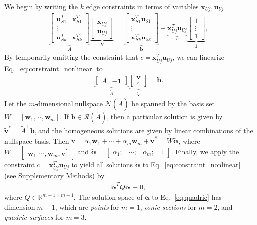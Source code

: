 \documentclass[%
preprint,
 amsmath,amssymb,
 aps,
]{revtex4-1}
\newcommand{\mc}{\mathcal}
\newcommand{\real}{\mathbb{R}}
\begin{document}
We begin by writing the $k$ edge constraints in terms of variables $\bm{x}_{Uj}, \bm{u}_{Uj}$
\begin{align}
\label{eq:constraint_nonlinear}
\underbrace{
\begin{bmatrix}
\bm{u}_{S1}^T & \bm{x}_{S1}^T\\
\vdots & \vdots\\
\bm{u}_{Sk}^T & \bm{x}_{Sk}^T
\end{bmatrix}
}_{A}
\underbrace{
\begin{bmatrix}
\bm{x}_{Uj} \\ 
\bm{u}_{Uj}
\end{bmatrix}
}_{\bm{v}}
=
\underbrace{
\begin{bmatrix} 
\bm{x}_{S1}^T\bm{u}_{S1}\\ 
\vdots\\
\bm{x}_{Sk}^T\bm{u}_{Sk}
\end{bmatrix}
}_{\bm{b}}
+
\underbrace{
\bm{x}_{Uj}^T\bm{u}_{Uj}
}_{c}
\underbrace{
\begin{bmatrix}
1\\
\vdots\\
1
\end{bmatrix}
}_{\bm{1}},
\end{align}
By temporarily omitting the constraint that $c = \bm{x}_{Uj}^T\bm{u}_{Uj}$, we can linearize Eq.~\ref{eq:constraint_nonlinear} to 
\begin{align}
\underbrace{
\begin{bmatrix}
A & -\bm{1}
\end{bmatrix}
}_{\tilde{A}}
\underbrace{
\begin{bmatrix}
\bm{v}\\
c
\end{bmatrix}
}_{\tilde{\bm{v}}}
=
\bm{b}.
\end{align}
Let the $m$-dimensional nullspace $\mc{N}(\tilde{A})$ be spanned by the basis set $W = [\bm{w}_1, \dotsm, \bm{w}_m]$. If $\bm{b} \in \mc R(\tilde{A})$, then a particular solution is given by $\tilde{\bm{v}}^* = \tilde{A}^+\bm{b}$, and the homogeneous solutions are given by linear combinations of the nullspace basis. Then $\tilde{\bm{v}} = \alpha_1\bm{w}_1 + \dotsm + \alpha_m\bm{w}_m + \tilde{\bm{v}}^* = \tilde{W}\bm{\tilde{\alpha}}$, where $\tilde{W} = \begin{bmatrix} \bm{w}_1, \dotsm, \bm{w}_m, \tilde{\bm{v}}^* \end{bmatrix}$ and $\bm{\tilde{\alpha}} = \begin{bmatrix}\alpha_1; & \dotsm; & \alpha_m; & 1\end{bmatrix}$. Finally, we apply the constraint $c = \bm{x}_{Uj}^T\bm{u}_{Uj}$ to yield all solutions $\bm{\tilde{\alpha}}$ to Eq.~\ref{eq:constraint_nonlinear} (see Supplementary Methods) by
\begin{align}
\label{eq:quadric}
\bm{\tilde{\alpha}}^T
Q
\bm{\tilde{\alpha}} = 0,
\end{align}
where $Q\in\real^{m+1 \times m+1}$. The solution space of $\bm{\tilde{\alpha}}$ to Eq.~\ref{eq:quadric} has dimension $m-1$, which are \emph{points} for $m=1$, \emph{conic sections} for $m=2$, and \emph{quadric surfaces} for $m=3$. 
\end{document}
